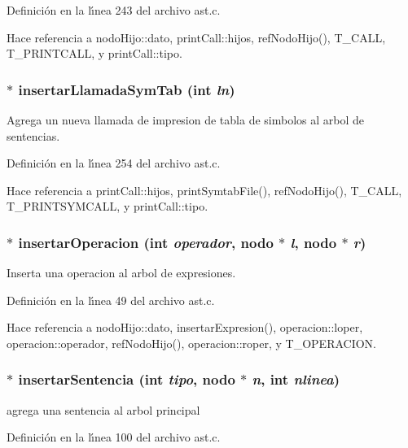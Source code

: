 Definici\'{o}n en la l\'{\i}nea 243 del archivo ast.c.

Hace referencia a nodo\-Hijo::dato, print\-Call::hijos, ref\-Nodo\-Hijo(), T\_\-CALL, T\_\-PRINTCALL, y print\-Call::tipo.
\subsubsection{$\ast$ insertar\-Llamada\-Sym\-Tab (int {\em ln})}\label{ast_8c_a17}


Agrega un nueva llamada de impresion de tabla de simbolos al arbol de sentencias. 



Definici\'{o}n en la l\'{\i}nea 254 del archivo ast.c.

Hace referencia a print\-Call::hijos, print\-Symtab\-File(), ref\-Nodo\-Hijo(), T\_\-CALL, T\_\-PRINTSYMCALL, y print\-Call::tipo.
\subsubsection{$\ast$ insertar\-Operacion (int {\em operador}, {\bf nodo} $\ast$ {\em l}, {\bf nodo} $\ast$ {\em r})}\label{ast_8c_a5}


Inserta una operacion al arbol de expresiones. 



Definici\'{o}n en la l\'{\i}nea 49 del archivo ast.c.

Hace referencia a nodo\-Hijo::dato, insertar\-Expresion(), operacion::loper, operacion::operador, ref\-Nodo\-Hijo(), operacion::roper, y T\_\-OPERACION.
\subsubsection{$\ast$ insertar\-Sentencia (int {\em tipo}, {\bf nodo} $\ast$ {\em n}, int {\em nlinea})}\label{ast_8c_a8}


agrega una sentencia al arbol principal 



Definici\'{o}n en la l\'{\i}nea 100 del archivo ast.c.

